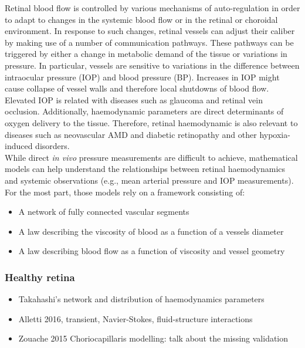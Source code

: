 \documentclass[12pt,a4paper]{article}
\begin{document}
Retinal blood flow is controlled by various mechanisms of auto-regulation in order to adapt to changes in the systemic blood flow or in the retinal or choroidal environment.
In response to such changes, retinal vessels can adjust their caliber by making use of a number of communication pathways.
These pathways can be triggered by either a change in metabolic demand of the tissue or variations in pressure.
In particular, vessels are sensitive to variations in the difference between intraocular pressure (IOP) and blood pressure (BP).
Increases in IOP might cause collapse of vessel walls and therefore local shutdowns of blood flow.
Elevated IOP is related with diseases such as glaucoma and retinal vein occlusion. 
Additionally, haemodynamic parameters are direct determinants of oxygen delivery to the tissue.
Therefore, retinal haemodynamic is also relevant to diseases such as neovascular AMD and diabetic retinopathy and other hypoxia-induced disorders. \\
While direct \textit{in vivo} pressure measurements are difficult to achieve, mathematical models can help understand the relationships between retinal haemodynamics and systemic observations (e.g., mean arterial pressure and IOP measurements).
For the most part, those models rely on a framework consisting of:
\begin{itemize}
\item A network of fully connected vascular segments
\item A law describing the viscosity of blood as a function of a vessels diameter
\item A law describing blood flow as a function of viscosity and vessel geometry
\end{itemize}

\subsubsection{Healthy retina}
\begin{itemize}
\item Takahashi's network and distribution of haemodynamics parameters
\item Alletti 2016, transient, Navier-Stokes, fluid-structure interactions
\item Zouache 2015 Choriocapillaris modelling: talk about the missing validation
\end{itemize}
\end{document}
